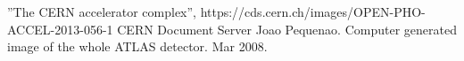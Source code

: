 \begin{thebibliography}{24}
”The CERN accelerator complex”, https://cds.cern.ch/images/OPEN-PHO-ACCEL-2013-056-1 CERN Document Server
Joao Pequenao. Computer generated image of the whole ATLAS detector. Mar 2008.
\end{thebibliography}
